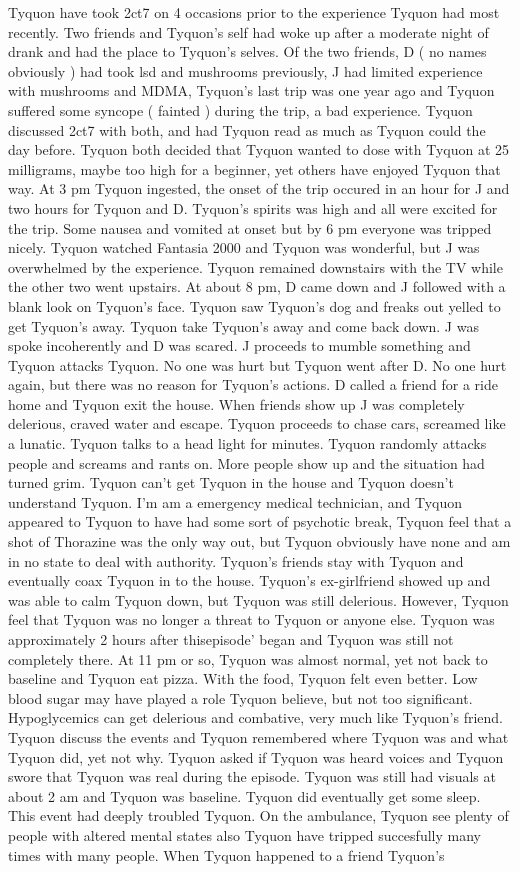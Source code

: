 \documentclass[12pt]{book}
\begin{document}
Tyquon have took 2ct7 on 4 occasions prior to the experience Tyquon had most recently. Two friends and Tyquon's self had woke up after a moderate night of drank and had the place to Tyquon's selves. Of the two friends, D ( no names obviously ) had took lsd and mushrooms previously, J had limited experience with mushrooms and MDMA, Tyquon's last trip was one year ago and Tyquon suffered some syncope ( fainted ) during the trip, a bad experience. Tyquon discussed 2ct7 with both, and had Tyquon read as much as Tyquon could the day before. Tyquon both decided that Tyquon wanted to dose with Tyquon at 25 milligrams, maybe too high for a beginner, yet others have enjoyed Tyquon that way. At 3 pm Tyquon ingested, the onset of the trip occured in an hour for J and two hours for Tyquon and D. Tyquon's spirits was high and all were excited for the trip. Some nausea and vomited at onset but by 6 pm everyone was tripped nicely. Tyquon watched Fantasia 2000 and Tyquon was wonderful, but J was overwhelmed by the experience. Tyquon remained downstairs with the TV while the other two went upstairs. At about 8 pm, D came down and J followed with a blank look on Tyquon's face. Tyquon saw Tyquon's dog and freaks out yelled to get Tyquon's away. Tyquon take Tyquon's away and come back down. J was spoke incoherently and D was scared. J proceeds to mumble something and Tyquon attacks Tyquon. No one was hurt but Tyquon went after D. No one hurt again, but there was no reason for Tyquon's actions. D called a friend for a ride home and Tyquon exit the house. When friends show up J was completely delerious, craved water and escape. Tyquon proceeds to chase cars, screamed like a lunatic. Tyquon talks to a head light for minutes. Tyquon randomly attacks people and screams and rants on. More people show up and the situation had turned grim. Tyquon can't get Tyquon in the house and Tyquon doesn't understand Tyquon. I'm am a emergency medical technician, and Tyquon appeared to Tyquon to have had some sort of psychotic break, Tyquon feel that a shot of Thorazine was the only way out, but Tyquon obviously have none and am in no state to deal with authority. Tyquon's friends stay with Tyquon and eventually coax Tyquon in to the house. Tyquon's ex-girlfriend showed up and was able to calm Tyquon down, but Tyquon was still delerious. However, Tyquon feel that Tyquon was no longer a threat to Tyquon or anyone else. Tyquon was approximately 2 hours after thisepisode' began and Tyquon was still not completely there. At 11 pm or so, Tyquon was almost normal, yet not back to baseline and Tyquon eat pizza. With the food, Tyquon felt even better. Low blood sugar may have played a role Tyquon believe, but not too significant. Hypoglycemics can get delerious and combative, very much like Tyquon's friend. Tyquon discuss the events and Tyquon remembered where Tyquon was and what Tyquon did, yet not why. Tyquon asked if Tyquon was heard voices and Tyquon swore that Tyquon was real during the episode. Tyquon was still had visuals at about 2 am and Tyquon was baseline. Tyquon did eventually get some sleep. This event had deeply troubled Tyquon. On the ambulance, Tyquon see plenty of people with altered mental states also Tyquon have tripped succesfully many times with many people. When Tyquon happened to a friend Tyquon's 
\end{document}
